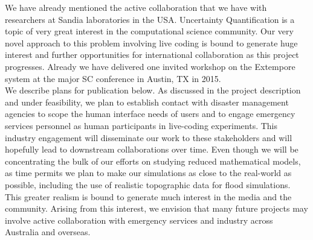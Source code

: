 



%

%

%




%

%



%

We have already mentioned the active collaboration that we have with researchers at Sandia laboratories in the USA. Uncertainty Quantification is a topic of very great interest in the computational science community. Our very novel approach to this problem involving live coding is bound to generate huge interest and further opportunities for international collaboration as this project progresses. Already we have delivered one invited workshop on the Extempore system at the major SC conference in Austin, TX in 2015. \\

We describe plans for publication below. 
As discussed in the project description and under feasibility, we plan to establish contact with disaster management agencies to scope the human interface needs of users and to engage emergency services personnel as human participants in live-coding experiments. This industry engagement will disseminate our work to these stakeholders and will hopefully lead to downstream collaborations over time.
 Even though we will be concentrating the bulk of our efforts on studying reduced mathematical models,
 as time permits we plan to make our simulations as close to the real-world as possible, including the use of realistic topographic data for flood simulations. This greater realism is bound to generate much interest in the media and the community. Arising from this interest, we envision that many future projects may involve active collaboration with emergency services and industry across Australia and overseas.


